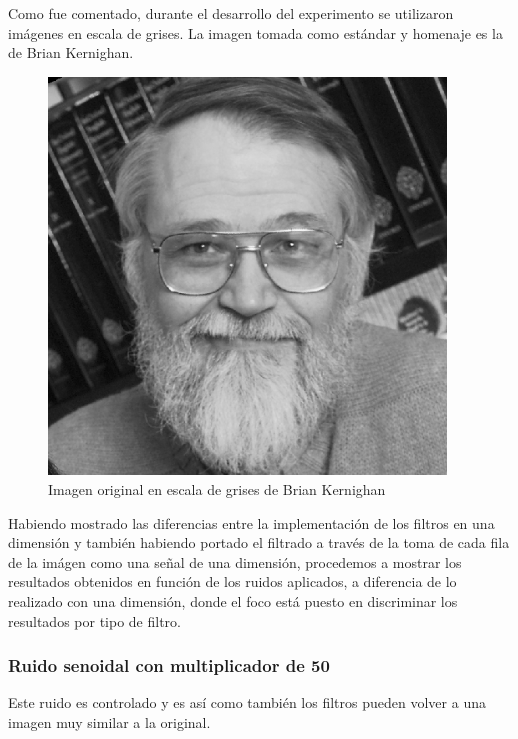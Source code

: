 Como fue comentado, durante el desarrollo del experimento se utilizaron
im\'agenes en escala de grises. La imagen tomada como est\'andar y homenaje es 
la de Brian Kernighan.

\begin{figure}[H]
\begin {center}
\includegraphics[width=299pt]{imagenes/brian_kernighan.png}
\end {center}
\caption{Imagen original en escala de grises de Brian Kernighan}
\label{fig:SinProm}
\end{figure}

Habiendo mostrado las diferencias entre la implementaci\'on de los filtros en
una dimensi\'on y tambi\'en habiendo portado el filtrado a trav\'es de la toma de cada
fila de la im\'agen como una se\~nal de una dimensi\'on, procedemos a mostrar
los resultados obtenidos en funci\'on de los ruidos aplicados, a diferencia de
lo realizado con una dimensi\'on, donde el foco est\'a puesto en discriminar los
resultados por tipo de filtro.

\subsubsection{Ruido senoidal con multiplicador de 50}

Este ruido es controlado y es as\'i como tambi\'en los filtros pueden volver a
una imagen muy similar a la original.

